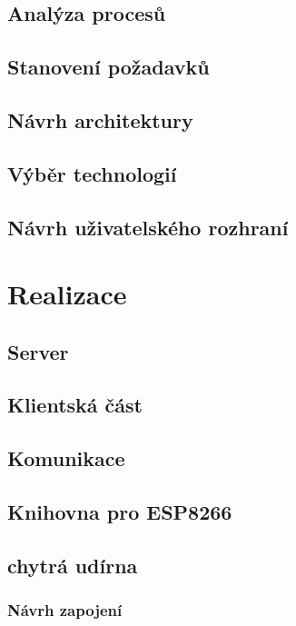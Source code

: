 \documentclass[thesis=B,czech]{FITthesis}[2019/12/23]
\begin{document}
\section{Analýza procesů}

\section{Stanovení požadavků}

\section{Návrh architektury}

\section{Výběr technologií}

\section{Návrh uživatelského rozhraní}




\chapter{Realizace}

\section{Server}

\section{Klientská část}

\section{Komunikace}

\section{Knihovna pro ESP8266}

\section{chytrá udírna}

\subsection{Návrh zapojení}
\end{document}
